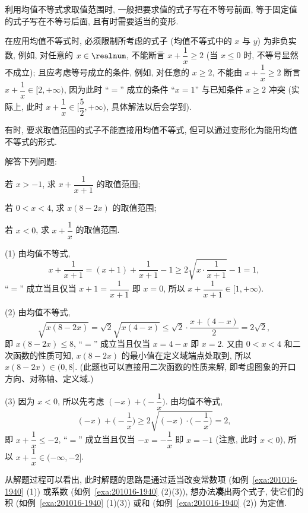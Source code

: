 利用均值不等式求取值范围时, 一般把要求值的式子写在不等号前面, 等于固定值的式子写在不等号后面, 且有时需要适当的变形.
  
在应用均值不等式时, 必须限制所考虑的式子 (均值不等式中的 $x$ 与 $y$) 为非负实数, 例如, 对任意的 $x\in\realnum$, 不能断言 $x+\dfrac1x\geqslant 2$ (当 $x\leqslant 0$ 时, 不等号显然不成立); 且应考虑等号成立的条件, 例如, 对任意的 $x\geqslant 2$, 不能由 $x+\dfrac1x\geqslant 2$ 断言 $x+\dfrac1x\in[2,+\infty)$, 因为此时 ``$=$'' 成立的条件 ``$x=1$'' 与已知条件 $x\geqslant 2$ 冲突 (实际上, 此时  $x+\dfrac1x\in \biggl[\dfrac52,+\infty\biggr)$, 具体解法以后会学到).

有时, 要求取值范围的式子不能直接用均值不等式, 但可以通过变形化为能用均值不等式的形式. 

\begin{example}\label{exa:201016-1940}
  解答下列问题: 
  \begin{subproblem}
    \item 若 $x>-1$, 求 $x+\dfrac1{x+1}$ 的取值范围;
    \item 若 $0<x<4$, 求 $x(8-2x)$ 的取值范围;
    \item 若 $x<0$, 求 $x+\dfrac1{x}$ 的取值范围.
  \end{subproblem}
\end{example}
\begin{solution}
  (1) 由均值不等式, 
  \[x+\dfrac1{x+1}= (x+1)+\dfrac1{x+1}-1
    \geqslant 2\sqrt{x\cdot\dfrac1{x+1}}-1=1,\]
  ``$=$'' 成立当且仅当 $x+1=\dfrac1{x+1}$ 即 $x=0$, 所以 $x+\dfrac1{x+1}\in[1,+\infty)$.
  
  (2) 由均值不等式, 
  \[\sqrt{x(8-2x)}= \sqrt2\sqrt{x(4-x)}
    \leqslant \sqrt2\cdot\frac{x+(4-x)}2= 2\sqrt2,\]
  即 $x(8-2x)\leqslant 8$, ``$=$'' 成立当且仅当 $x=4-x$ 即 $x=2$. 又由 $0<x<4$ 和二次函数的性质可知, $x(8-2x)$ 的最小值在定义域端点处取到, 所以 $x(8-2x)\in(0,8]$. (此题也可以直接用二次函数的性质来解, 即考虑图象的开口方向、对称轴、定义域.)
  
  (3) 因为 $x<0$, 所以先考虑 $(-x)+\biggl(-\dfrac1{x}\biggr)$. 由均值不等式, 
  \[(-x)+\biggl(-\dfrac1{x}\biggr)
    \geqslant 2\sqrt{(-x)\cdot\biggl(-\dfrac1{x}\biggr)}=2,\]
  即 $x+\dfrac1x\leqslant -2$, ``$=$'' 成立当且仅当 $-x= -\dfrac1{x}$ 即 $x=-1$ (注意, 此时 $x<0$), 所以 $x+\dfrac1{x}\in (-\infty,-2]$.
\end{solution}

从解题过程可以看出, 此时解题的思路是通过适当改变常数项 (如例~\ref{exa:201016-1940} (1)) 或系数 (如例~\ref{exa:201016-1940} (2)(3)), 想办法{\bfseries 凑}出两个式子, 使它们的积 (如例~\ref{exa:201016-1940} (1)(3)) 或和 (如例~\ref{exa:201016-1940} (2)) 为定值.
